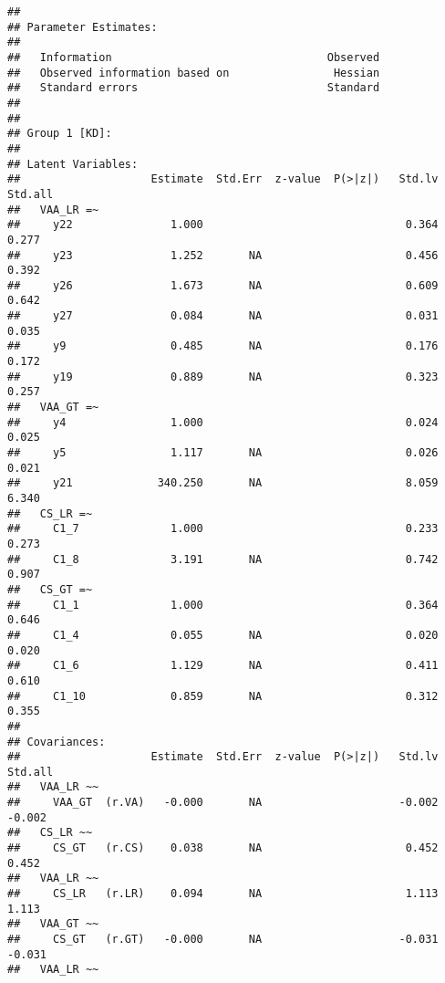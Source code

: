 \documentclass[
]{article}
\begin{document}
\begin{verbatim}
## 
## Parameter Estimates:
## 
##   Information                                 Observed
##   Observed information based on                Hessian
##   Standard errors                             Standard
## 
## 
## Group 1 [KD]:
## 
## Latent Variables:
##                    Estimate  Std.Err  z-value  P(>|z|)   Std.lv  Std.all
##   VAA_LR =~                                                             
##     y22               1.000                               0.364    0.277
##     y23               1.252       NA                      0.456    0.392
##     y26               1.673       NA                      0.609    0.642
##     y27               0.084       NA                      0.031    0.035
##     y9                0.485       NA                      0.176    0.172
##     y19               0.889       NA                      0.323    0.257
##   VAA_GT =~                                                             
##     y4                1.000                               0.024    0.025
##     y5                1.117       NA                      0.026    0.021
##     y21             340.250       NA                      8.059    6.340
##   CS_LR =~                                                              
##     C1_7              1.000                               0.233    0.273
##     C1_8              3.191       NA                      0.742    0.907
##   CS_GT =~                                                              
##     C1_1              1.000                               0.364    0.646
##     C1_4              0.055       NA                      0.020    0.020
##     C1_6              1.129       NA                      0.411    0.610
##     C1_10             0.859       NA                      0.312    0.355
## 
## Covariances:
##                    Estimate  Std.Err  z-value  P(>|z|)   Std.lv  Std.all
##   VAA_LR ~~                                                             
##     VAA_GT  (r.VA)   -0.000       NA                     -0.002   -0.002
##   CS_LR ~~                                                              
##     CS_GT   (r.CS)    0.038       NA                      0.452    0.452
##   VAA_LR ~~                                                             
##     CS_LR   (r.LR)    0.094       NA                      1.113    1.113
##   VAA_GT ~~                                                             
##     CS_GT   (r.GT)   -0.000       NA                     -0.031   -0.031
##   VAA_LR ~~                                                             

\end{verbatim}
\end{document}
